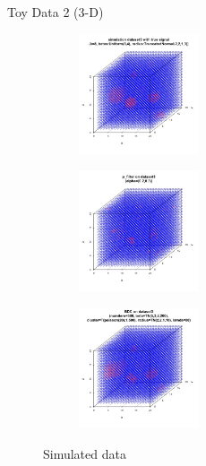\documentclass[10pt,mathserif]{beamer}
\begin{document}
\begin{frame}{Toy Data 2 (3-D)}
\begin{figure}[t!]
    \centering
    \begin{subfigure}[t]{0.3\textwidth}
        \centering
        \includegraphics[height=1.4in, width=1.4in]{../simulation_data3.jpg}
        \caption{}
    \end{subfigure}%
    \begin{subfigure}[t]{0.3\textwidth}
        \centering
        \includegraphics[height=1.4in, width=1.4in]{../p_filterondataset3.jpg}
        \caption{}
    \end{subfigure}%
        \begin{subfigure}[t]{0.3\textwidth}
        \centering
        \includegraphics[height=1.4in, width=1.4in]{../best3.jpg}
        \caption{}
    \end{subfigure}
    \caption{Simulated data}
\end{figure}
\end{frame}
\end{document}

